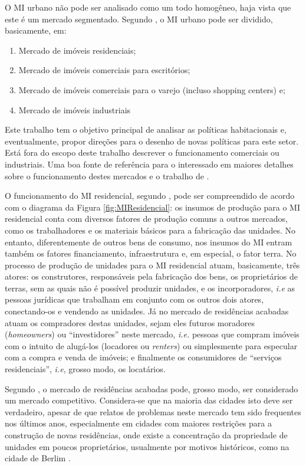 \documentclass[
	12pt,				%
	oneside,			%
	a4paper,			%
	chapter=TITLE,		%
	section=TITLE,		%
	english,			%
	brazil				%
	]{abntex2}
\begin{document}
\begin{refsection}
O \gls{MI} urbano não pode ser analisado como um todo homogêneo, haja vista que
este é um mercado segmentado. Segundo \textcite{wheaton1999}, o \gls{MI} urbano pode ser dividido, basicamente, em:
\begin{enumerate}
\def\labelenumi{\arabic{enumi}.}
\tightlist
\item
  Mercado de imóveis residenciais;
\item
  Mercado de imóveis comerciais para escritórios;
\item
  Mercado de imóveis comerciais para o varejo (incluso shopping centers) e;
\item
  Mercado de imóveis industriais
\end{enumerate}
Este trabalho tem o objetivo principal de analisar as políticas habitacionais e,
eventualmente, propor direções para o desenho de novas políticas para este setor.
Está fora do escopo deste trabalho descrever o funcionamento comerciais ou
industriais. Uma boa fonte de referência para o interessado em maiores detalhes
sobre o funcionamento destes mercados e o trabalho de \textcite{wheaton1999}.

O funcionamento do \gls{MI} residencial, segundo \textcite[p.~188-189]{shelter}, pode
ser compreendido de acordo com o diagrama da Figura \ref{fig:MIResidencial}: os
insumos de produção para o \gls{MI} residencial conta com diversos fatores de
produção comuns a outros mercados, como os trabalhadores e os materiais básicos
para a fabricação das unidades. No entanto, diferentemente de outros bens de
consumo, nos insumos do \gls{MI} entram também os fatores financiamento,
infraestrutura e, em especial, o fator terra. No processo de produção de
unidades para o \gls{MI} residencial atuam, basicamente, três atores: os
construtores, responsáveis pela fabricação dos bens, os proprietários de terras,
sem as quais não é possível produzir unidades, e os incorporadores, \emph{i.e} as
pessoas jurídicas que trabalham em conjunto com os outros dois atores,
conectando-os e vendendo as unidades. Já no mercado de residências acabadas
atuam os compradores destas unidades, sejam eles futuros moradores
(\emph{homeowners}) ou ``investidores'' neste mercado, \emph{i.e.} pessoas que compram
imóveis com o intuito de alugá-los (locadores ou \emph{renters}) ou simplesmente para
especular com a compra e venda de imóveis; e finalmente os consumidores de
``serviços residenciais'', \emph{i.e}, grosso modo, os locatários.

Segundo \textcite[p.~189]{shelter}, o mercado de residências acabadas pode, grosso modo,
ser considerado um mercado competitivo. Considera-se que na maioria das cidades
isto deve ser verdadeiro, apesar de que relatos de problemas neste mercado tem
sido frequentes nos últimos anos, especialmente em cidades com maiores
restrições para a construção de novas residências, onde existe a concentração da
propriedade de unidades em poucos proprietários, usualmente por motivos
históricos, como na cidade de Berlim \autocite{berlim}.


\end{refsection}
\end{document}
